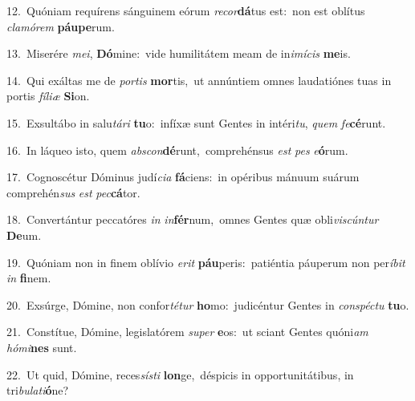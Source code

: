{\numbfont\textcolor{\numbcolor}{12.}}~Quóniam requírens sánguinem eórum \textit{re}\-\textit{cor}\textbf{dá}tus est:~\star non est oblítus \textit{cla}\-\textit{mó}\textit{rem} \textbf{páu}\-\textbf{pe}rum.\par
{\numbfont\textcolor{\numbcolor}{13.}}~Miserére \textit{me}\-\textit{i}, \textbf{Dó}\-mine:~\star vide humilitátem meam de in\-\textit{i}\-\textit{mí}\textit{cis} \textbf{me}\-is.\par
{\numbfont\textcolor{\numbcolor}{14.}}~Qui exáltas me de \textit{por}\-\textit{tis} \textbf{mor}\-tis,~\star ut annúntiem omnes laudatiónes tuas in portis \textit{fí}\-\textit{li}\textit{æ} \textbf{Si}\-on.\par
{\numbfont\textcolor{\numbcolor}{15.}}~Exsultábo in salu\-\textit{tá}\-\textit{ri} \textbf{tu}\-o:~\star infíxæ sunt Gentes in intéri\-\textit{tu}\-, \textit{quem} \textit{fe}\-\textbf{cé}runt.\par
{\numbfont\textcolor{\numbcolor}{16.}}~In láqueo isto, quem \textit{abs}\-\textit{con}\textbf{dé}runt,~\star comprehénsus \textit{est} \textit{pes} \textit{e}\-\textbf{ó}rum.\par
{\numbfont\textcolor{\numbcolor}{17.}}~Cognoscétur Dóminus judí\-\textit{ci}\-\textit{a} \textbf{fá}\-ciens:~\star in opéribus mánuum suárum comprehén\textit{sus} \textit{est} \textit{pec}\-\textbf{cá}tor.\par
{\numbfont\textcolor{\numbcolor}{18.}}~Convertántur peccatóres \textit{in} \textit{in}\-\textbf{fér}num,~\star omnes Gentes quæ obli\-\textit{vis}\-\textit{cún}\textit{tur} \textbf{De}\-um.\par
{\numbfont\textcolor{\numbcolor}{19.}}~Quóniam non in finem oblívio \textit{e}\-\textit{rit} \textbf{páu}\-peris:~\star patiéntia páuperum non per\-\textit{í}\-\textit{bit} \textit{in} \textbf{fi}\-nem.\par
{\numbfont\textcolor{\numbcolor}{20.}}~Exsúrge, Dómine, non confor\-\textit{té}\-\textit{tur} \textbf{ho}\-mo:~\star judicéntur Gentes in \textit{con}\-\textit{spéc}\textit{tu} \textbf{tu}\-o.\par
{\numbfont\textcolor{\numbcolor}{21.}}~Constítue, Dómine, legislatórem \textit{su}\-\textit{per} \textbf{e}\-os:~\star ut sciant Gentes quóni\textit{am} \textit{hó}\-\textit{mi}\textbf{nes} sunt.\par
{\numbfont\textcolor{\numbcolor}{22.}}~Ut quid, Dómine, reces\-\textit{sís}\-\textit{ti} \textbf{lon}\-ge,~\star déspicis in opportunitátibus, in tri\-\textit{bu}\-\textit{la}\textit{ti}\textbf{ó}ne?\par
